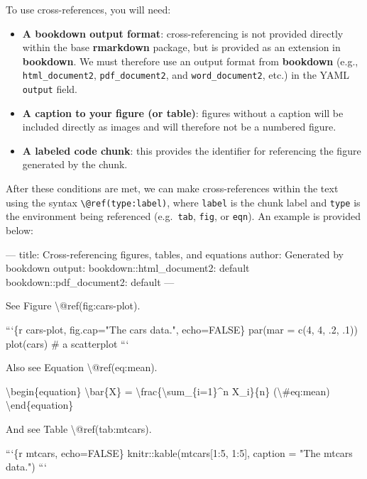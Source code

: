 \documentclass[
  11pt,
]{krantz}
\newenvironment{Shaded}{\begin{snugshade}}{\end{snugshade}}
\newcommand{\BaseNTok}[1]{\textcolor[rgb]{0.06,0.06,0.06}{#1}}
\newcommand{\NormalTok}[1]{#1}
\begin{document}
To use cross-references, you will need:

\begin{itemize}
\item
  \textbf{A bookdown output format}: cross-referencing is not provided directly within the base \textbf{rmarkdown} package, but is provided as an extension in \textbf{bookdown}. We must therefore use an output format from \textbf{bookdown} (e.g., \texttt{html\_document2}, \texttt{pdf\_document2}, and \texttt{word\_document2}, etc.) in the YAML \texttt{output} field.
\item
  \textbf{A caption to your figure (or table)}: figures without a caption will be included directly as images and will therefore not be a numbered figure.
\item
  \textbf{A labeled code chunk}: this provides the identifier for referencing the figure generated by the chunk.
\end{itemize}

After these conditions are met, we can make cross-references within the text using the syntax \texttt{\textbackslash{}@ref(type:label)}, where \texttt{label} is the chunk label and \texttt{type} is the environment being referenced (e.g.~\texttt{tab}, \texttt{fig}, or \texttt{eqn}). An example is provided below:

\begin{Shaded}
\begin{Highlighting}[]
\NormalTok{---}
\NormalTok{title: Cross-referencing figures, tables, and equations}
\NormalTok{author: Generated by bookdown}
\NormalTok{output:}
\NormalTok{  bookdown::html_document2: default}
\NormalTok{  bookdown::pdf_document2: default}
\NormalTok{---}

\NormalTok{See Figure \textbackslash{}@ref(fig:cars-plot).}

\BaseNTok{```\{r cars-plot, fig.cap="The cars data.", echo=FALSE\}}
\BaseNTok{par(mar = c(4, 4, .2, .1))}
\BaseNTok{plot(cars)  # a scatterplot}
\BaseNTok{```}

\NormalTok{Also see Equation \textbackslash{}@ref(eq:mean).}

\NormalTok{\textbackslash{}begin\{equation\}}
\NormalTok{\textbackslash{}bar\{X\} = \textbackslash{}frac\{\textbackslash{}sum_\{i=1\}^n X_i\}\{n\} (\textbackslash{}#eq:mean)}
\NormalTok{\textbackslash{}end\{equation\}}

\NormalTok{And see Table \textbackslash{}@ref(tab:mtcars).}

\BaseNTok{```\{r mtcars, echo=FALSE\}}
\BaseNTok{knitr::kable(mtcars[1:5, 1:5], caption = "The mtcars data.")}
\BaseNTok{```}
\end{Highlighting}
\end{Shaded}
\end{document}
